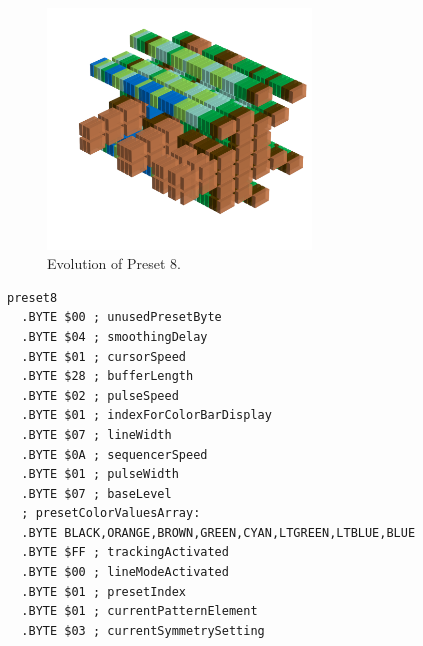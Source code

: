 \begin{minipage}[b]{0.48\linewidth}
\begin{figure}[H]                                                          
  \centering                                                             
  \begin{adjustbox}{width=7cm,center}                                   
  \includegraphics[width=7cm]{src/presets/pattern8-45.png}%
  \end{adjustbox}                                                        
\caption{Evolution of Preset 8.}                                           
\end{figure}                                                               
                                                                 
                                                                           
\end{minipage}
\hspace{0.1cm}
\begin{minipage}[b]{0.48\linewidth}                                       
\begin{lstlisting}[basicstyle=\ttfamily\scriptsize,caption=Data structure for Preset 8.]
preset8
  .BYTE $00 ; unusedPresetByte
  .BYTE $04 ; smoothingDelay
  .BYTE $01 ; cursorSpeed
  .BYTE $28 ; bufferLength
  .BYTE $02 ; pulseSpeed
  .BYTE $01 ; indexForColorBarDisplay
  .BYTE $07 ; lineWidth
  .BYTE $0A ; sequencerSpeed
  .BYTE $01 ; pulseWidth
  .BYTE $07 ; baseLevel
  ; presetColorValuesArray: 
  .BYTE BLACK,ORANGE,BROWN,GREEN,CYAN,LTGREEN,LTBLUE,BLUE
  .BYTE $FF ; trackingActivated
  .BYTE $00 ; lineModeActivated
  .BYTE $01 ; presetIndex
  .BYTE $01 ; currentPatternElement
  .BYTE $03 ; currentSymmetrySetting
\end{lstlisting}
\end{minipage}



